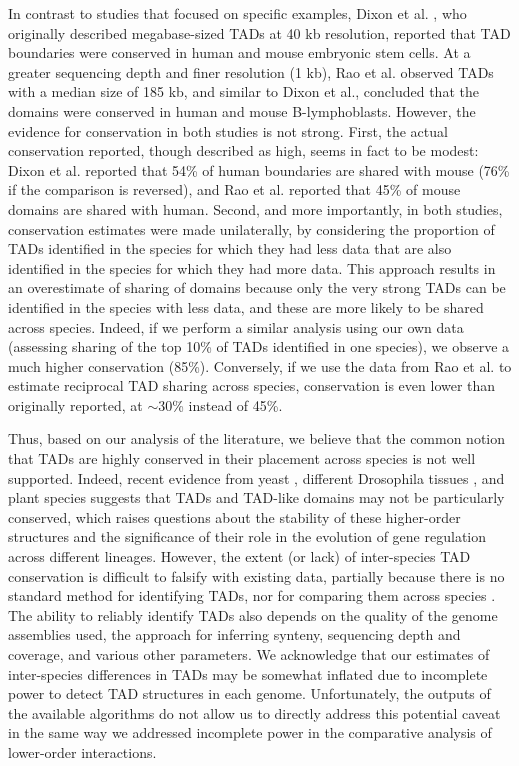 In contrast to studies that focused on specific examples, Dixon et al. \cite{Dixon.2012}, who originally described megabase-sized TADs at 40 kb resolution, reported that TAD boundaries were conserved in human and mouse embryonic stem cells. At a greater sequencing depth and finer resolution (1 kb), Rao et al. \cite{Rao.2014} observed TADs with a median size of 185 kb, and similar to Dixon et al., concluded that the domains were conserved in human and mouse B-lymphoblasts. However, the evidence for conservation in both studies is not strong. First, the actual conservation reported, though described as high, seems in fact to be modest: Dixon et al. reported that 54\% of human boundaries are shared with mouse (76\% if the comparison is reversed), and Rao et al. reported that 45\% of mouse domains are shared with human. Second, and more importantly, in both studies, conservation estimates were made unilaterally, by considering the proportion of TADs identified in the species for which they had less data that are also identified in the species for which they had more data. This approach results in an overestimate of sharing of domains because only the very strong TADs can be identified in the species with less data, and these are more likely to be shared across species. Indeed, if we perform a similar analysis using our own data (assessing sharing of the top 10\% of TADs identified in one species), we observe a much higher conservation (85\%). Conversely, if we use the data from Rao et al. to estimate reciprocal TAD sharing across species, conservation is even lower than originally reported, at $\sim$30\% instead of 45\%.

Thus, based on our analysis of the literature, we believe that the common notion that TADs are highly conserved in their placement across species is not well supported. Indeed, recent evidence from yeast \cite{Tjong.2012}, different Drosophila tissues \cite{Rowley.2017}, and plant species \cite{Dong.2017} suggests that TADs and TAD-like domains may not be particularly conserved, which raises questions about the stability of these higher-order structures and the significance of their role in the evolution of gene regulation across different lineages. However, the extent (or lack) of inter-species TAD conservation is difficult to falsify with existing data, partially because there is no standard method for identifying TADs, nor for comparing them across species \cite{Dali.2017, Forcato.2017}. The ability to reliably identify TADs also depends on the quality of the genome assemblies used, the approach for inferring synteny, sequencing depth and coverage, and various other parameters. We acknowledge that our estimates of inter-species differences in TADs may be somewhat inflated due to incomplete power to detect TAD structures in each genome. Unfortunately, the outputs of the available algorithms do not allow us to directly address this potential caveat in the same way we addressed incomplete power in the comparative analysis of lower-order interactions.

